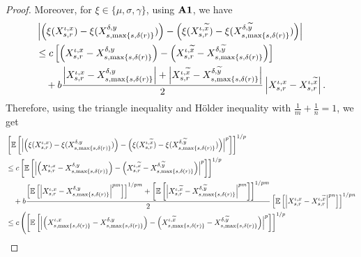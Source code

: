 \documentclass[11pt]{article}
\theoremstyle{theorem}
\theoremstyle{definition}
\newcommand{\1}{{\bf 1}}
\begin{document}
\begin{proof}
Moreover, for $\xi \in \{\mu, \sigma, \gamma\}$, using  $\bf{A1}$, we have
\begin{align*}
& \left|\left(\xi(X^{\iota, x}_{s,r})-\xi(X^{\delta,y}_{s,\max\{s, \delta(r)\}})\right) - \left(\xi(X^{\iota, \widetilde{x}}_{s,r})-\xi(X^{\delta, \widetilde{y}}_{s,\max\{s, \delta(r)\}})\right)\right| \notag\\
& \leq c \left[\left(X^{\iota, x}_{s,r}-X^{\delta,y}_{s,\max\{s, \delta(r)\}}\right) - \left(X^{\iota, \widetilde{x}}_{s,r}-X^{\delta, \widetilde{y}}_{s,\max\{s, \delta(r)\}}\right)\right] \notag\\
& \quad + b \dfrac{\left|X^{\iota, x}_{s,r}-X^{\delta,y}_{s,\max\{s, \delta(r)\}}\right| +  \left|X^{\iota, \widetilde{x}}_{s,r}-X^{\delta, \widetilde{y}}_{s,\max\{s, \delta(r)\}}\right|}{2} \left|X^{\iota, x}_{s,r} - X^{\iota, \widetilde{x} }_{s,r}\right|.  
\end{align*}
Therefore, using the triangle inequality and H\"older inequality with $\frac{1}{m}+\frac{1}{n}=1$, we get
\begin{align}
& \left[\mathbb{E}\left[\left|\left(\xi(X^{\iota, x}_{s,r})-\xi(X^{\delta,y}_{s,\max\{s, \delta(r)\}})\right) - \left(\xi(X^{\iota, \widetilde{x}}_{s,r})-\xi(X^{\delta, \widetilde{y}}_{s,\max\{s, \delta(r)\}})\right)\right|^p\right]\right]^{1/p} \notag\\
& \leq c \left[\mathbb{E}\left[\left|\left(X^{\iota, x}_{s,r}-X^{\delta,y}_{s,\max\{s, \delta(r)\}}\right) - \left(X^{\iota, \widetilde{x}}_{s,r}-X^{\delta, \widetilde{y}}_{s,\max\{s, \delta(r)\}}\right)\right|^p\right]\right]^{1/p}   \notag\\
& \quad + b \dfrac{\left[\mathbb{E}\left[\left|X^{\iota, x}_{s,r}-X^{\delta,y}_{s,\max\{s, \delta(r)\}}\right|^{pm}\right]\right]^{1/pm} + \left[\mathbb{E} \left[\left|X^{\iota, \widetilde{x}}_{s,r}-X^{\delta, \widetilde{y}}_{s,\max\{s, \delta(r)\}}\right|^{pm}\right]\right]^{1/pm}}{2} \left[\mathbb{E}\left[\left|X^{\iota, x}_{s,r} - X^{\iota, \widetilde{x} }_{s,r}\right|^{pn}\right]\right]^{1/pn}    \notag\\
& \leq c \left( \left[\mathbb{E}\left[\left|\left(X^{\iota, x}_{s,\max\{s, \delta(r)\}}-X^{\delta,y}_{s,\max\{s, \delta(r)\}}\right) - \left(X^{\iota, \widetilde{x}}_{s,\max\{s, \delta(r)\}}-X^{\delta, \widetilde{y}}_{s,\max\{s, \delta(r)\}}\right)\right|^p\right]\right]^{1/p} \right.\notag\\

\end{align}
\end{proof}
\end{document}
